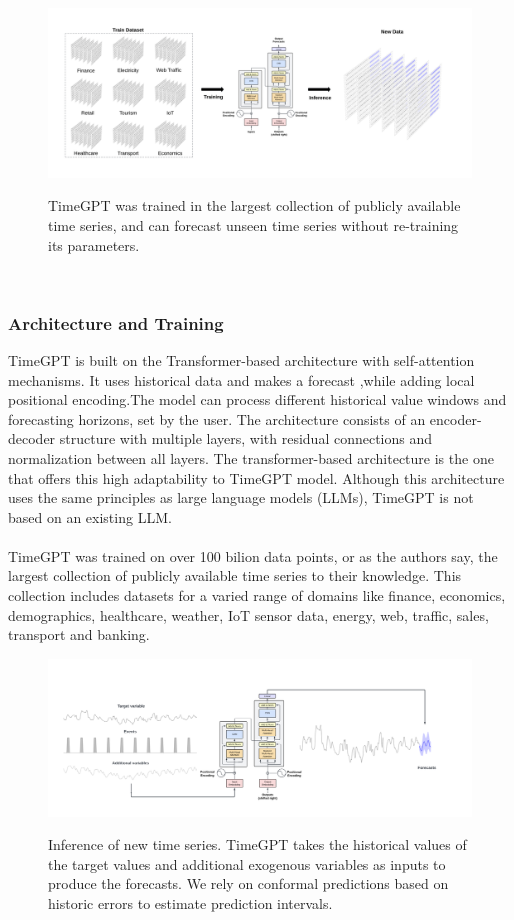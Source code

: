 \documentclass{article}
\begin{document}
\begin{figure}[h]
\includegraphics[width=1\linewidth]{images/foundation_model.png}
    \label{fig:mesh1}
    \caption{TimeGPT was trained in the largest collection of publicly available time series, and can
forecast unseen time series without re-training its parameters.}
\end{figure}
\\

\newpage
\subsubsection{Architecture and Training}
TimeGPT is built on the Transformer-based architecture with self-attention mechanisms. It uses historical data and makes a forecast ,while adding local positional encoding.The model can process different historical value windows and forecasting horizons, set by the user. The architecture consists of an encoder-decoder structure with multiple layers, with residual connections and normalization between all layers. The transformer-based architecture is the one that offers this high adaptability to TimeGPT model. Although this architecture uses the same principles as large language models (LLMs), TimeGPT is not based on an existing LLM.\\
\\
TimeGPT was trained on over 100 bilion data points, or as the authors say, the largest collection of publicly available time series to their knowledge. This collection includes datasets for a varied range of domains like finance, economics, demographics, healthcare, weather, IoT sensor data, energy, web, traffic, sales, transport and banking. 

\begin{figure}[h]
\includegraphics[width=1\linewidth]{images/timegpt_prediction.png}
    \label{fig:mesh1}
    \caption{Inference of new time series. TimeGPT takes the historical values of the target values and
additional exogenous variables as inputs to produce the forecasts. We rely on conformal predictions
based on historic errors to estimate prediction intervals.}
\end{figure}
\end{document}
